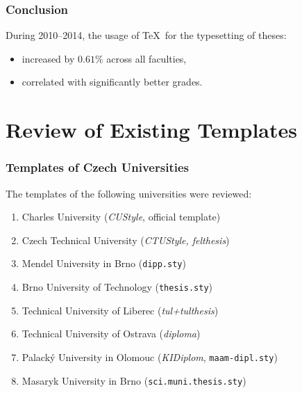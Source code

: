 \documentclass[11pt,twoside]{article}
\def\pkg#1{{\sf#1}}
\let\pkg\emph
\let\oldframetitle\frametitle
\def\frametitle#1{\oldframetitle{#1}\noindent}
\begin{document}
\begin{frame}
  \frametitle{Conclusion}
  During 2010--2014, the usage of \TeX\ for the typesetting of
  theses: \begin{itemize}
    \item increased by $0.61\%$ across all faculties,
    \item correlated with significantly better grades.
  \end{itemize}
\end{frame}
\FloatBarrier
\clearpage
\section{Review of Existing Templates}
\def\right#1{{\hfill\ifbeamerarticle\else
    \textcolor{white!33!black}{\scriptsize
  \fi(#1)\ifbeamerarticle\else}\fi}}
\begin{frame}[fragile]
  \frametitle{Templates of Czech Universities}
  The templates of the following universities were reviewed:
  \begin{enumerate}
    \item Charles University\right{\pkg{CUStyle}, official template}
    \item Czech Technical University\right{\pkg{CTUStyle, felthesis}}
    \item Mendel University in Brno\right{\texttt{dipp.sty}}
    \item Brno University of Technology\right{\texttt{thesis.sty}}
    \item Technical University of Liberec\right{\pkg{tul+tulthesis}}
    \item Technical University of Ostrava\right{\pkg{diploma}}
    \item Palacký University in Olomouc\right{\pkg{KIDiplom},
      \texttt{maam-dipl.sty}}
    \item Masaryk University in Brno\right{\texttt{sci.muni.thesis.sty}}
  \end{enumerate}
\end{frame}
\end{document}
